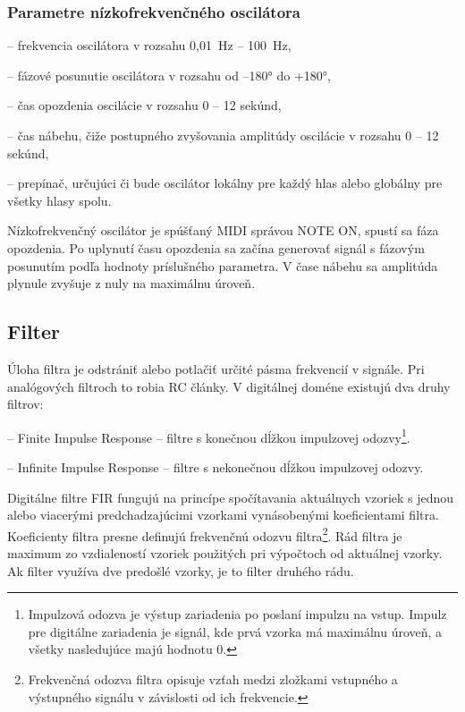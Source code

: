 \subsubsection{Parametre nízkofrekvenčného oscilátora}
\begin{description}
\setlength{\itemsep}{-0.5ex}
\item[frekvencia] -- frekvencia oscilátora v rozsahu 0,01~Hz -- 100~Hz,
\item[fázové posunutie] -- fázové posunutie oscilátora v rozsahu od --180° do +180°,
\item[opozdenie] -- čas opozdenia oscilácie v rozsahu 0 -- 12 sekúnd,
\item[nábeh] -- čas nábehu, čiže postupného zvyšovania amplitúdy oscilácie v rozsahu 0 -- 12 sekúnd,
\item[globálny/lokálny] -- prepínač, určujúci či bude oscilátor lokálny pre každý hlas alebo globálny pre všetky hlasy spolu.
\end{description}

Nízkofrekvenčný oscilátor je spúšťaný MIDI správou NOTE ON, spustí sa fáza opozdenia. Po uplynutí času opozdenia sa začína generovať signál s fázovým posunutím podľa hodnoty príslušného parametra. V čase nábehu sa amplitúda plynule zvyšuje z nuly na maximálnu úroveň.

\subsection{Filter}

Úloha filtra je odstrániť alebo potlačiť určité pásma frekvencií v signále. Pri analógových filtroch to robia RC články. V digitálnej doméne existujú dva druhy filtrov:

\begin{description}
\setlength{\itemsep}{-0.5ex}
\item[FIR] -- Finite Impulse Response -- filtre s konečnou dĺžkou impulzovej odozvy\footnote{Impulzová odozva je výstup zariadenia po poslaní impulzu na vstup. Impulz pre digitálne zariadenia je signál, kde prvá vzorka má maximálnu úroveň, a všetky nasledujúce majú hodnotu 0.}.
\item[IIR] -- Infinite Impulse Response -- filtre s nekonečnou dĺžkou impulzovej odozvy.
\end{description}

Digitálne filtre FIR fungujú na princípe spočítavania aktuálnych vzoriek s jednou alebo viacerými predchadzajúcimi vzorkami vynásobenými koeficientami filtra. Koeficienty filtra presne definujú frekvenčnú odozvu filtra\footnote{Frekvenčná odozva filtra opisuje vzťah medzi zložkami vstupného a výstupného signálu v závislosti od ich frekvencie.}. Rád filtra je maximum zo vzdialeností vzoriek použitých pri výpočtoch od aktuálnej vzorky. Ak filter využíva dve predošlé vzorky, je to filter druhého rádu.

